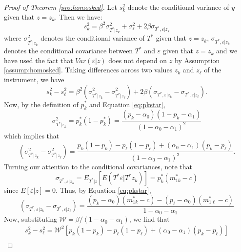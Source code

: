 \begin{proof}[Proof of Theorem \ref{pro:homosked}]
  Let $s^2_k$ denote the conditional variance of $y$ given that $z=z_k$.
  Then we have:
\begin{equation}
  s_k^2 = \beta^2 \sigma^2_{T^*|z_k} + \sigma^2_\varepsilon + 2\beta \sigma_{T^*,\varepsilon|z_k}
\end{equation}
where $\sigma^2_{T^*|z_k}$ denotes the conditional variance of $T^*$ given that $z = z_k$, $\sigma_{T^*,\varepsilon|z_k}$ denotes the conditional covariance between $T^*$ and $\varepsilon$ given that $z=z_k$ and we have used the fact that $Var(\varepsilon|z)$ does not depend on $z$ by Assumption \ref{assump:homosked}.
Taking differences across two values $z_k$ and $z_\ell$ of the instrument, we have
\begin{equation}
  s^2_k - s^2_\ell = \beta^2\left( \sigma^2_{T^*|z_k} - \sigma^2_{T^*|z_\ell} \right) + 2\beta \left( \sigma_{T^*,\varepsilon|z_k} - \sigma_{T^*,\varepsilon|z_\ell} \right).
\end{equation}
Now, by the definition of $p^*_k$ and Equation \ref{eq:pkstar},
\begin{equation}
  \sigma^2_{T^*|z_k}= p^*_k (1-p^*_k) = \frac{(p_k - \alpha_0)(1 - p_k - \alpha_1)}{(1 - \alpha_0 - \alpha_1)^2} 
\end{equation}
which implies that 
\begin{equation}
  \left( \sigma^2_{T^*|z_k} - \sigma^2_{T^*|z_\ell} \right)= \frac{p_k(1-p_k) - p_\ell(1-p_\ell) + (\alpha_0 - \alpha_1)(p_k - p_\ell)}{(1 - \alpha_0 - \alpha_1)^2}.
\end{equation}
Turning our attention to the conditional covariances, note that
\begin{equation}
  \sigma_{T^*,\varepsilon|z_k} = E_{T^*|z}\left[E\left( T^*\varepsilon|T^*z_k \right)  \right] = p_k^* (m^*_{1k}-c) 
\end{equation}
since $E[\varepsilon|z] = 0$.
Thus, by Equation \ref{eq:pkstar},
\begin{equation}
  \left( \sigma_{T^*,\varepsilon|z_k} - \sigma_{T^*,\varepsilon|z_\ell} \right) = \frac{(p_k - \alpha_0)(m^*_{1k}-c) - (p_\ell - \alpha_0)(m^*_{1\ell}-c)}{1 - \alpha_0 - \alpha_1} 
\end{equation}
Now, substituting $\mathcal{W} = \beta/(1-\alpha_0-\alpha_1)$, we find that
\begin{align*}
  s^2_k - s^2_\ell = \mathcal{W}^2\left[p_k(1-p_k) - p_\ell(1-p_\ell) + (\alpha_0 - \alpha_1)(p_k - p_\ell)\right]\\  

\end{align*}
\end{proof}
